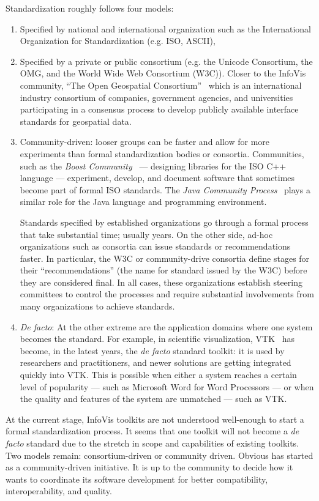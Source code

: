 Standardization roughly follows four models: 
\begin{enumerate}[noitemsep]
\item Specified by national and international organization such as the
  International Organization for Standardization (e.g. ISO, ASCII),

\item Specified by a private or public consortium (e.g. the Unicode
  Consortium, the OMG, and the World Wide Web Consortium (W3C)). Closer to
  the InfoVis community, ``The Open Geospatial
  Consortium''~\cite{OpenGeospatial} which is an international
  industry consortium of companies, government agencies, and
  universities participating in a consensus process to develop
  publicly available interface standards for geospatial data.

\item Community-driven: looser groups can be faster and allow for more
  experiments than formal standardization bodies or consortia.
  Communities, such as the \emph{Boost
    Community}~\cite{Boost} --- designing
  libraries for the ISO C++ language --- experiment, develop, and
  document software that sometimes become part of formal ISO
  standards.  The \emph{Java Community
    Process}~\cite{JCP} plays a similar role
  for the Java language and programming environment.

  Standards specified by established organizations go through a formal
  process that take substantial time; usually years.  On the other
  side, ad-hoc organizations such as consortia can issue standards or
  recommendations faster.  In particular, the W3C or community-drive
  consortia define stages for their ``recommendations'' (the name for
  standard issued by the W3C) before they are considered final.  In
  all cases, these organizations establish steering committees to
  control the processes and require substantial involvements from many
  organizations to achieve standards.

\item \textit{De facto}: At the other extreme are the application
  domains where one system becomes the standard.  For example, in
  scientific visualization, VTK~\cite{VTK} has become, in the latest
  years, the \textit{de facto} standard toolkit: it is used by
  researchers and practitioners, and newer solutions are getting
  integrated quickly into VTK.  This is possible when either a
  system reaches a certain level of popularity --- such as Microsoft
  Word for Word Processors --- or when the quality and features of the
  system are unmatched --- such as VTK.
\end{enumerate}

At the current stage, InfoVis toolkits are not understood well-enough
to start a formal standardization process.  It seems that one toolkit
will not become a \textit{de facto} standard due to the stretch in
scope and capabilities of existing toolkits.  Two models remain:
consortium-driven or community driven.  Obvious has started as a
community-driven initiative.  It is up to the community to decide how
it wants to coordinate its software development for better
compatibility, interoperability, and quality.
